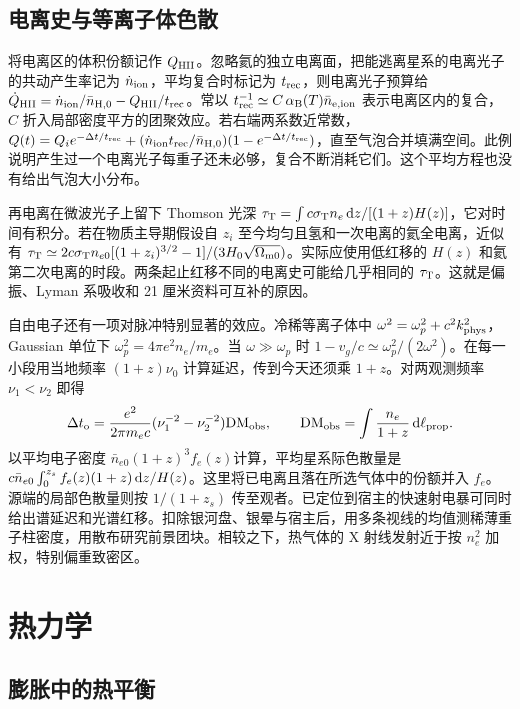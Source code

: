 \subsection{电离史与等离子体色散}

将电离区的体积份额记作 $Q_{\rm HII}$。忽略氦的独立电离面，把能逃离星系的电离光子的共动产生率记为 $\dot n_{\rm ion}$，平均复合时标记为 $t_{\rm rec}$，则电离光子预算给 $\dot Q_{\rm HII}=\dot n_{\rm ion}/\bar n_{\rm H,0}-Q_{\rm HII}/t_{\rm rec}$。常以 $t_{\rm rec}^{-1}\simeq C\,\alpha_{\rm B}(T)\bar n_{\rm e,ion}$ 表示电离区内的复合，$C$ 折入局部密度平方的团聚效应。若右端两系数近常数，$Q(t)=Q_i e^{-\Delta t/t_{\rm rec}}+(\dot n_{\rm ion} t_{\rm rec}/\bar n_{\rm H,0})(1-e^{-\Delta t/t_{\rm rec}})$，直至气泡合并填满空间。此例说明产生过一个电离光子每重子还未必够，复合不断消耗它们。这个平均方程也没有给出气泡大小分布。

再电离在微波光子上留下 Thomson 光深 $\tau_{\rm T}=\int c\sigma_{\rm T}n_e\,\dd z/[(1+z)H(z)]$，它对时间有积分。若在物质主导期假设自 $z_i$ 至今均匀且氢和一次电离的氦全电离，近似有 $\tau_{\rm T}\simeq 2c\sigma_{\rm T}n_{e0}[(1+z_i)^{3/2}-1]/(3H_0\sqrt{\Omega_{\rm m0}})$。实际应使用低红移的 $H(z)$ 和氦第二次电离的时段。两条起止红移不同的电离史可能给几乎相同的 $\tau_{\rm T}$。这就是偏振、Lyman 系吸收和 21 厘米资料可互补的原因。

自由电子还有一项对脉冲特别显著的效应。冷稀等离子体中 $\omega^2=\omega_p^2+c^2k_{\rm phys}^2$，Gaussian 单位下 $\omega_p^2=4\pi e^2 n_e/m_e$。当 $\omega\gg\omega_p$ 时 $1-v_g/c\simeq\omega_p^2/(2\omega^2)$。在每一小段用当地频率 $(1+z)\nu_0$ 计算延迟，传到今天还须乘 $1+z$。对两观测频率 $\nu_1<\nu_2$ 即得
\[
 \Delta t_{\rm o}=\frac{e^2}{2\pi m_ec}(\nu_1^{-2}-\nu_2^{-2}){\rm DM}_{\rm obs},
 \qquad {\rm DM}_{\rm obs}=\int\frac{n_e}{1+z}\,\dd\ell_{\rm prop}.
\]
以平均电子密度 $\bar n_{e0}(1+z)^3 f_e(z)$计算，平均星系际色散量是 $c\bar n_{e0}\int_0^{z_s} f_e(z)(1+z)\,\dd z/H(z)$。这里将已电离且落在所选气体中的份额并入 $f_e$。源端的局部色散量则按 $1/(1+z_s)$ 传至观者。已定位到宿主的快速射电暴可同时给出谱延迟和光谱红移。扣除银河盘、银晕与宿主后，用多条视线的均值测稀薄重子柱密度，用散布研究前景团块。相较之下，热气体的 X 射线发射近于按 $n_e^2$ 加权，特别偏重致密区。

\section{热力学}\label{sec:cosmo-thermal}

\subsection{膨胀中的热平衡}

